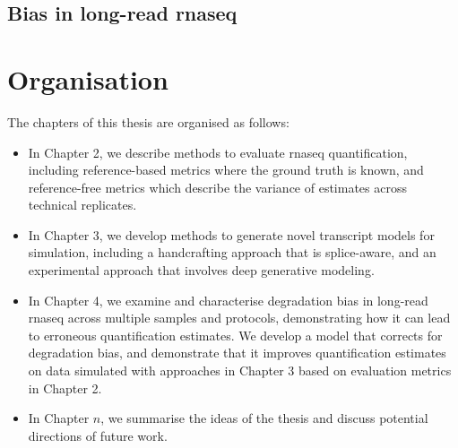 \subsection{Bias in long-read \gls{rnaseq}}

\lipsum[3]

\section{Organisation}

The chapters of this thesis are organised as follows:
\begin{itemize}
    \item In Chapter 2, we describe methods to evaluate \gls{rnaseq} quantification, including reference-based metrics where the ground truth is known, and reference-free metrics which describe the variance of estimates across technical replicates. 
    \item In Chapter 3, we develop methods to generate novel transcript models for simulation, including a handcrafting approach that is splice-aware, and an experimental approach that involves deep generative modeling.
    \item In Chapter 4, we examine and characterise degradation bias in long-read \gls{rnaseq} across multiple samples and protocols, demonstrating how it can lead to erroneous quantification estimates. We develop a model that corrects for degradation bias, and demonstrate that it improves quantification estimates on data simulated with approaches in Chapter 3 based on evaluation metrics in Chapter 2. 
    \item In Chapter $n$, we summarise the ideas of the thesis and discuss potential directions of future work. 
\end{itemize}